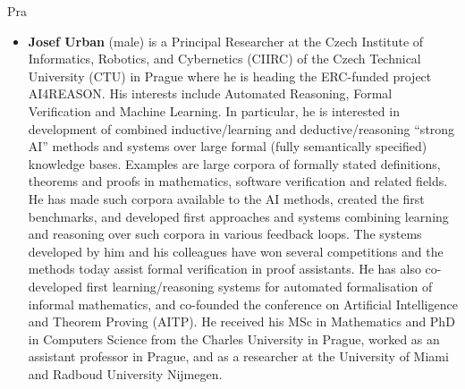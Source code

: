 \begin{sitedescription}{Pra}


\begin{itemize}
\item
\textbf{Josef Urban} (male) is a Principal Researcher at the Czech Institute of Informatics, Robotics, and Cybernetics (CIIRC) of the Czech Technical University (CTU) in Prague where he is heading the ERC-funded project
AI4REASON. His interests include Automated Reasoning, Formal Verification and Machine Learning. In particular, he is interested in development of combined inductive/learning and deductive/reasoning
``strong AI'' methods and systems over large formal (fully semantically specified) knowledge bases. Examples are large corpora of formally stated definitions, theorems and proofs in mathematics, software
verification and related fields.  He has made such corpora available to the AI methods, created the first benchmarks, and developed first approaches and systems combining learning and reasoning over such
corpora in various feedback loops.  The systems developed by him and his colleagues have won several competitions and the methods today assist formal verification in proof assistants. He has also
co-developed first learning/reasoning systems for automated formalisation of informal mathematics, and co-founded the conference on Artificial Intelligence and Theorem Proving (AITP).
He received his MSc in Mathematics and PhD in Computers Science from
the Charles University in Prague, worked as an assistant professor in
Prague, and as a researcher at the University of Miami and Radboud
University Nijmegen.




\end{itemize}
\end{sitedescription}
